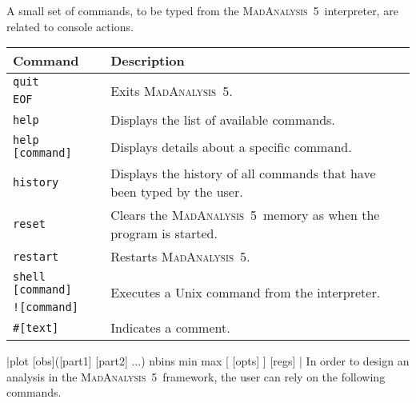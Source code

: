 \documentclass[a4paper]{article}
\newcommand{\MA}{\textsc{MadAnalysis}~5}
\begin{document}
\noindent A small set of commands, to be typed from the \MA\ interpreter, are related to
console actions.\\
\renewcommand{\arraystretch}{1.2}%
\begin{center}\begin{tabular}{l p{8.8cm}}
\hline
Command & Description\\
\hline
\color{ao} \verb?quit?           & \multirow{2}{*}{Exits \MA.}\\
\color{ao} \verb?EOF?            & \\
\color{ao} \verb?help?           & Displays the list of available commands.\\
\color{ao} \verb?help [command]? & Displays details about a specific command.\\
\color{ao} \verb?history?        & Displays the history of all commands that have been
                        typed by the user.\\
\color{ao} \verb?reset?          & Clears the \MA\ memory as when the program is started.\\
\color{ao} \verb?restart?        & Restarts \MA.\\
\color{ao} \verb?shell [command]?& \multirow{2}{*}{Executes a {\sc Unix} command from the
   interpreter.}\\
\color{ao} \verb?![command]?     & \\
\color{ao} \verb?#[text]?        & Indicates a comment.\\
\hline
\end{tabular}
\end{center}
\verbdef{\verbtextc}|plot [obs]([part1] [part2] ...) nbins min max [ [opts] ] { [regs] }|
\verbdef{\verbtexte}{[criterion]}
In order to design an analysis in the \MA\ framework, the user can rely on the
following commands.
\renewcommand{\arraystretch}{1.2}%
\end{document}
